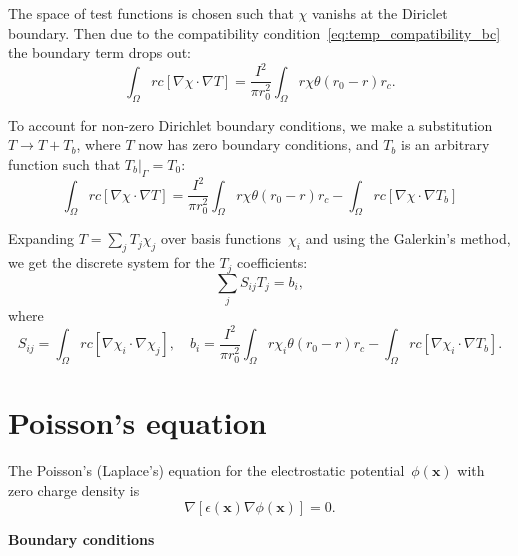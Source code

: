 \documentclass[10pt]{article}
\renewcommand{\vec}[1]{\mathbf{#1}}
\newcommand{\vx}{\vec{x}}
\begin{document}
The space of test functions is chosen such that $\chi$ vanishs at the Diriclet
boundary. Then due to the compatibility condition~\eqref{eq:temp_compatibility_bc}
the boundary term drops out:
\begin{equation}
\int_\Omega r c [ \nabla \chi \cdot \nabla T ]
= \frac{I^2}{\pi r_0^2} \int_\Omega r \chi \theta(r_0 - r) r_c.
\end{equation}

To account for non-zero Dirichlet boundary conditions, we make a substitution
$T \to T + T_b$, where $T$ now has zero boundary conditions, and $T_b$ is an
arbitrary function such that $T_b |_\Gamma = T_0$:
\begin{equation}
\int_\Omega r c [ \nabla \chi \cdot \nabla T ]
= \frac{I^2}{\pi r_0^2} \int_\Omega r \chi \theta(r_0 - r) r_c
- \int_\Omega r c [ \nabla \chi \cdot \nabla T_b ]
\end{equation}

Expanding $T = \sum_j T_j \chi_j$ over basis functions~$\chi_i$ and using the
Galerkin's method, we get the discrete system for the $T_j$ coefficients:
\begin{equation}
\sum_j S_{ij} T_j = b_i,
\end{equation}
where
\begin{equation}
S_{ij} = \int_\Omega r c [ \nabla\chi_i \cdot \nabla\chi_j ], \quad
%
b_i = \frac{I^2}{\pi r_0^2} \int_\Omega r \chi_i \theta(r_0 - r) r_c
- \int_\Omega r c [ \nabla\chi_i \cdot \nabla T_b ].
\end{equation}

\section*{Poisson's equation}

The Poisson's (Laplace's) equation for the electrostatic potential~$\phi(\vx)$
with zero charge density is
\begin{equation}
\nabla[ \epsilon(\vx) \nabla \phi(\vx) ] = 0.
\end{equation}

\textbf{Boundary conditions}
\end{document}
